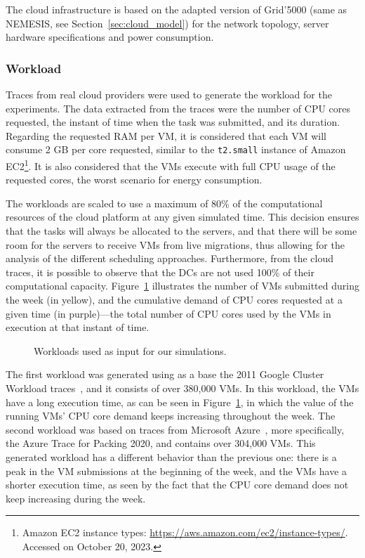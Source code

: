 \label{sec:settings_smartgreens}

The cloud infrastructure is based on the adapted version of Grid'5000 (same as NEMESIS, see Section~\ref{sec:cloud_model}) for the network topology,  server hardware specifications and power consumption.

\subsubsection{Workload}

Traces from real cloud providers were used to generate the workload for the experiments. The data extracted from the traces were the number of CPU cores requested, the instant of time when the task was submitted, and its duration. Regarding the requested RAM per VM, it is considered that each VM will consume 2 GB per core requested, similar to the \texttt{t2.small} instance of Amazon EC2\footnote{Amazon EC2 instance types: \url{https://aws.amazon.com/ec2/instance-types/}. Accessed on October 20, 2023.}. It is also considered that the VMs execute with full CPU usage of the requested cores, the worst scenario for energy consumption. 

The workloads are scaled to use a maximum of 80\% of the computational resources of the cloud platform at any given simulated time. This decision ensures that the tasks will always be allocated to the servers, and that there will be some room for the servers to receive VMs from live migrations, thus allowing for the analysis of the different scheduling approaches. Furthermore, from the cloud traces, it is possible to observe that the DCs are not used 100\% of their computational capacity. Figure~\ref{fig:workload} illustrates the number of VMs submitted during the week (in yellow), and the cumulative demand of CPU cores requested at a given time (in purple)---the total number of CPU cores used by the VMs in execution at that instant of time.

\begin{figure}[h]
  \centering
   {}
  \caption{Workloads used as input for our simulations.}
  \label{fig:workload}
 \end{figure}

The first workload was generated using as a base the 2011 Google Cluster Workload traces~\cite{google2011traces}, and it consists of over 380,000 VMs. In this workload, the VMs have a long execution time, as can be seen in Figure~\ref{fig:workload}, in which the value of the running VMs' CPU core demand keeps increasing throughout the week. The second workload was based on traces from Microsoft Azure~\cite{hadary2020protean}, more specifically, the Azure Trace for Packing 2020, and contains over 304,000 VMs. This generated workload has a different behavior than the previous one: there is a peak in the VM submissions at the beginning of the week, and the VMs have a shorter execution time, as seen by the fact that the CPU core demand does not keep increasing during the week.


